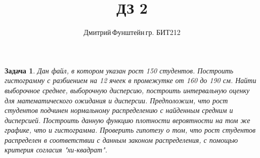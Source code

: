 \documentclass[a4paper,12pt]{article}
\newtheorem{problem}{Задача}
\begin{document}
\title{ДЗ 2}
\author{Дмитрий\,Фунштейн\,гр. БИТ212}
\maketitle

\begin{problem}
    Дан файл, в котором указан рост 150 студентов. 
    Построить гистограмму с разбиением на 12 ячеек в промежутке 
    от 160 до 190 см. Найти выборочное среднее, выборочную дисперсию, 
    построить интервальную оценку для математического ожидания и дисперсии. 
    Предположим, что рост студентов подчинен нормальному распределению 
    с найденным средним и дисперсией. Построить данную функцию плотности 
    вероятности на том же графике, что и гистограмма. Проверить гипотезу 
    о том, что рост студентов распределен в соответствии с данным законом 
    распределения, с помощью критерия согласия "хи-квадрат".
\end{problem}
\end{document}
